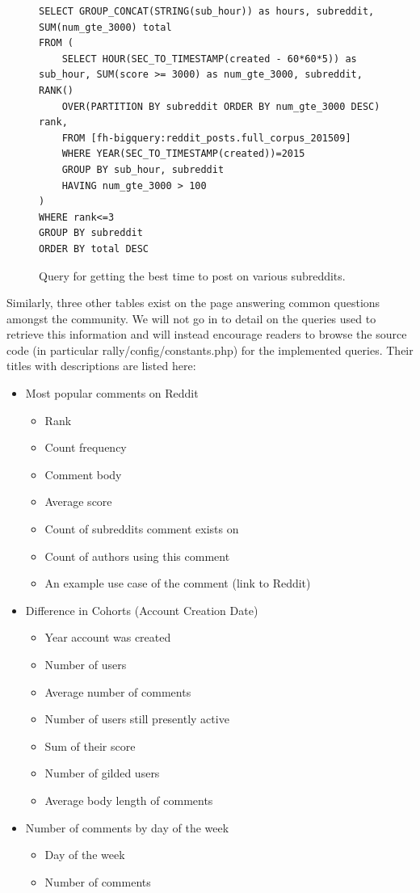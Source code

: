 \documentclass[msc,oneside]{ubcthesis}%
\begin{document}
\begin{figure}[H]
\begin{center}
\begin{lstlisting}
SELECT GROUP_CONCAT(STRING(sub_hour)) as hours, subreddit, SUM(num_gte_3000) total 
FROM ( 
	SELECT HOUR(SEC_TO_TIMESTAMP(created - 60*60*5)) as sub_hour, SUM(score >= 3000) as num_gte_3000, subreddit, RANK() 
	OVER(PARTITION BY subreddit ORDER BY num_gte_3000 DESC) rank, 
	FROM [fh-bigquery:reddit_posts.full_corpus_201509] 
	WHERE YEAR(SEC_TO_TIMESTAMP(created))=2015 
	GROUP BY sub_hour, subreddit 
	HAVING num_gte_3000 > 100 
) 
WHERE rank<=3 
GROUP BY subreddit 
ORDER BY total DESC
\end{lstlisting}
\end{center}
\caption[Query for getting the best time to post on various subreddits]{
Query for getting the best time to post on various subreddits.}
\label{fig:besttime}
\end{figure}

Similarly, three other tables exist on the page answering common questions amongst the community. We will not go in to detail on the queries used to retrieve this information and will instead encourage readers to browse the source code (in particular rally/config/constants.php) for the implemented queries. Their titles with descriptions are listed here:
\begin{itemize}
\item{Most popular comments on Reddit}
	\begin{itemize}
	\item{Rank}
	\item{Count frequency}
	\item{Comment body}
	\item{Average score}
	\item{Count of subreddits comment exists on}
	\item{Count of authors using this comment}
	\item{An example use case of the comment (link to Reddit)}
	\end{itemize}
	
\item{Difference in Cohorts (Account Creation Date)}
	\begin{itemize}
	\item{Year account was created}
	\item{Number of users}
	\item{Average number of comments}
	\item{Number of users still presently active}
	\item{Sum of their score}
	\item{Number of gilded users}
	\item{Average body length of comments}
	\end{itemize}
	
\item{Number of comments by day of the week}
	\begin{itemize}
	\item{Day of the week}
	\item{Number of comments}
	\end{itemize}
\end{itemize}
\end{document}
